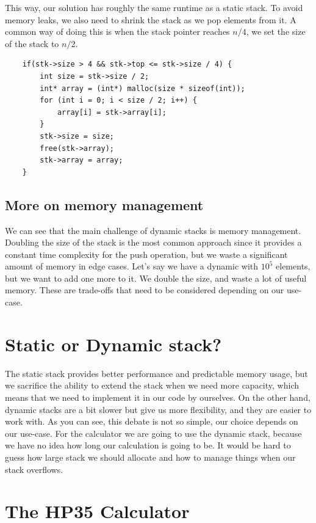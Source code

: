 \documentclass[a4paper,11pt]{article}
\begin{document}
    This way, our solution has roughly the same runtime as a static stack.
    To avoid memory leaks, we also need to shrink the stack as we pop elements from it.
    A common way of doing this is when the stack pointer reaches $n/4$, we set the size of the stack to $n/2$.
    \begin{verbatim}
    if(stk->size > 4 && stk->top <= stk->size / 4) {
        int size = stk->size / 2;
        int* array = (int*) malloc(size * sizeof(int));
        for (int i = 0; i < size / 2; i++) {
            array[i] = stk->array[i];
        }
        stk->size = size;
        free(stk->array);
        stk->array = array;
    }
    \end{verbatim}

    \subsection*{More on memory management}
    We can see that the main challenge of dynamic stacks is memory management.
    Doubling the size of the stack is the most common approach since it provides a constant time complexity for the push operation, but we waste a significant amount of memory in edge cases.
    Let's say we have a dynamic with $10^5$ elements, but we want to add one more to it.
    We double the size, and waste a lot of useful memory.
    These are trade-offs that need to be considered depending on our use-case.

    \section*{Static or Dynamic stack?}

    The static stack provides better performance and predictable memory usage, but we sacrifice the ability to extend the stack when we need more capacity, which means that we need to implement it in our code by ourselves.
    On the other hand, dynamic stacks are a bit slower but give us more flexibility, and they are easier to work with.
    As you can see, this debate is not so simple, our choice depends on our use-case.
    For the calculator we are going to use the dynamic stack, because we have no idea how long our calculation is going to be.
    It would be hard to guess how large stack we should allocate and how to manage things when our stack overflows.

    \section*{The HP35 Calculator}
\end{document}
